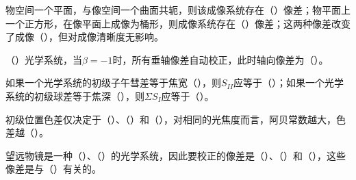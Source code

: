 \documentclass[padl, analysis, notocnum]{ExBook}
\newcommand{\answerarea}[1][3.5cm]{%
  \par\vspace{1mm}%
  \noindent{\color{themeColor!35}\rule{\linewidth}{0.4pt}}\par
  \noindent\begin{minipage}[t][#1][t]{\linewidth}\vspace{0pt}\end{minipage}\par
  \noindent{\color{themeColor!35}\rule{\linewidth}{0.4pt}}\par
}
\begin{document}
\begin{qitems}[startnum=8]
\qitem 物空间一个平面，与像空间一个曲面共轭，则该成像系统存在（\hspace{1.6em}）像差；物平面上一个正方形，在像平面上成像为桶形，则成像系统存在（\hspace{1.6em}）像差；这两种像差改变了成像（\hspace{1.6em}），但对成像清晰度无影响。
\label{q:121:start}
\answerarea[4.0cm]
\label{q:121:end}
\end{qitems}

\begin{qitems}[startnum=9]
\qitem （\hspace{1.6em}）光学系统，当$\beta =-1$时，所有垂轴像差自动校正，此时轴向像差为（\hspace{1.6em}）。
\label{q:122:start}
\answerarea[4.0cm]
\label{q:122:end}
\end{qitems}

\begin{qitems}[startnum=10]
\qitem 如果一个光学系统的初级子午彗差等于焦宽（\hspace{1.6em}），则$S_{II}$应等于（\hspace{1.6em}）；如果一个光学系统的初级球差等于焦深（\hspace{1.6em}），则$\Sigma S_{I}$应等于（\hspace{1.6em}）。
\label{q:123:start}
\answerarea[4.0cm]
\label{q:123:end}
\end{qitems}

\begin{qitems}[startnum=11]
\qitem 初级位置色差仅决定于（\hspace{1.6em}）、（\hspace{1.6em}）和（\hspace{1.6em}），对相同的光焦度而言，阿贝常数越大，色差越（\hspace{1.6em}）。
\label{q:124:start}
\answerarea[4.0cm]
\label{q:124:end}
\end{qitems}

\begin{qitems}[startnum=12]
\qitem 望远物镜是一种（\hspace{1.6em}）、（\hspace{1.6em}）的光学系统，因此要校正的像差是（\hspace{1.6em}）、（\hspace{1.6em}）和（\hspace{1.6em}），这些像差是与（\hspace{1.6em}）有关的。
\label{q:125:start}
\answerarea[4.0cm]
\label{q:125:end}
\end{qitems}
\end{document}
